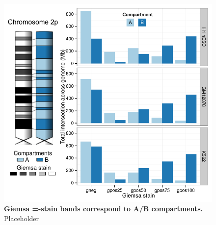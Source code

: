 \documentclass[a4paper,10pt,oneside]{book}
\begin{document}
\begin{figure}
\begin{center} 
\includegraphics[width=.7\textwidth]{figs/gbands.pdf}
\captionsetup{width=\textwidth}
\caption{ {\bf Giemsa =-stain bands correspond to A/B compartments.}
Placeholder
}\label{fig:gbands}
\end{center}
\end{figure} 
\end{document}
